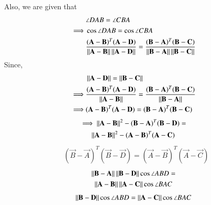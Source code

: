 Also, we are given that
\begin{align}
 & \angle DAB  =  \angle CBA \\
 \implies &\cos\angle DAB  =  \cos\angle CBA \\
 &  \frac{(\mathbf A -\mathbf B)^T(\mathbf{A}-\mathbf{D})}{\left\lVert\mathbf{A}-\mathbf{B}\right\rVert \left\lVert\mathbf{A}-\mathbf{D}\right\rVert } = \frac{(\mathbf B -\mathbf A)^T(\mathbf{B}-\mathbf{C})}{\left\lVert\mathbf{B}-\mathbf{A}\right\rVert \left\lVert\mathbf{B}-\mathbf{C}\right\rVert}
 \end{align}
Since,
\begin{align}
	& \left\lVert\mathbf{A}-\mathbf{D}\right\rVert  =  \left\lVert\mathbf{B}-\mathbf{C}\right\rVert \\
	\implies & \frac{(\mathbf A -\mathbf B)^T(\mathbf{A}-\mathbf{D})}{\left\lVert\mathbf{A}-\mathbf{B}\right\rVert} = \frac{(\mathbf B -\mathbf A)^T(\mathbf{B}-\mathbf{C})}{\left\lVert\mathbf{B}-\mathbf{A}\right\rVert} \\
    \implies & (\mathbf A -\mathbf B)^T(\mathbf{A}-\mathbf{D}) =  (\mathbf B -\mathbf A)^T(\mathbf{B}-\mathbf{C})
\end{align}
\begin{multline}
 \implies \left\lVert\mathbf{A}-\mathbf{B}\right\rVert^2 - (\mathbf B -\mathbf A)^T(\mathbf{B}-\mathbf{D})  =\\ \left\lVert\mathbf{A}-\mathbf{B}\right\rVert^2 - (\mathbf A -\mathbf B)^T(\mathbf{A}-\mathbf{C}) 
\end{multline}
\begin{align}
& (\vec B -\vec A)^T(\vec{B}-\vec{D}) = (\vec A -\vec B)^T(\vec{A}-\vec{C})\label{1}
\end{align}
\begin{multline}
 \left\lVert\mathbf{B} - \mathbf{A}\right\rVert\left\lVert\mathbf{B} - \mathbf{D}\right\rVert\cos\angle ABD  = \\ \left\lVert\mathbf{A} - \mathbf{B}\right\rVert\left\lVert\mathbf{A} - \mathbf{C}\right\rVert\cos\angle BAC 	
\end{multline}
\begin{align}
 \left\lVert\mathbf{B} - \mathbf{D}\right\rVert\cos\angle ABD  = \left\lVert\mathbf{A} - \mathbf{C}\right\rVert\cos\angle BAC \label{2}
\end{align}
